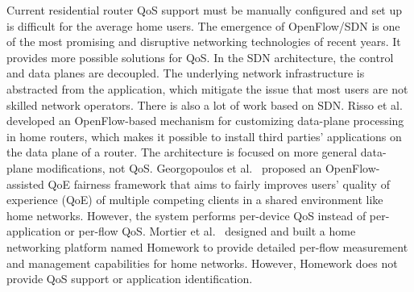 
Current residential router QoS support must be manually configured and set up is difficult for the average home users. The emergence of OpenFlow/SDN is one of the most promising and disruptive networking technologies of recent years. It provides more possible solutions for QoS. In the SDN architecture, the control and data planes are decoupled. The underlying network infrastructure is abstracted from the application, which mitigate the issue that most users are not skilled network operators. There is also a lot of work based on SDN. Risso et al.~\cite{risso2012customizing} developed an OpenFlow-based mechanism for customizing data-plane processing in home routers, which makes it possible to install third parties' applications on the data plane of a router. The architecture is focused on more general data-plane modifications, not QoS. Georgopoulos et al.~\cite{georgopoulos2013towards} proposed an OpenFlow-assisted QoE fairness framework that aims to fairly improves users’ quality of experience (QoE) of multiple competing clients in a shared environment like home networks. However, the system performs per-device QoS instead of per-application or per-flow QoS. Mortier et al.~\cite{mortier2011supporting} designed and built a home networking platform named Homework to provide detailed per-flow measurement and management capabilities for home networks. However, Homework does not provide QoS support or application identification. 

